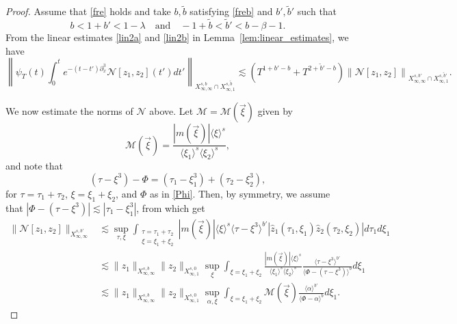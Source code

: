 \documentclass[a4paper,
11pt,  reqno]{amsart}
\newcommand{\jap}[1]{\langle #1 \rangle}
\newcommand{\5}{\textup{V}}
\newcommand{\ft}{\widehat}
\newcommand{\les}{\lesssim}
\newcommand{\wt}{\widetilde}
\theoremstyle{remark}
\newcommand{\jb}[1]
{\langle #1 \rangle}
\newcommand{\M}{\mathcal{M}}
\numberwithin{equation}{section}
\numberwithin{theorem}{section}
\newcommand{\Ncal}{\mathcal{N}}
\begin{document}
		\begin{proof}
Assume that \eqref{fre} holds and take $b,\wt b$ satisfying \eqref{freb} and $b', \wt b'$ such that
			$$
			 b < 1+b'< 1-\lambda
             \quad
             \text{and}
             \quad 
             -1+\wt{b}<\wt{b}'<b-\beta-1.
$$
From the linear estimates \eqref{lin2a} and \eqref{lin2b} in Lemma~\ref{lem:linear_estimates}, we have
        $$
        \left\|\psi_T(t)\int_0^t e^{-(t-t')\partial_x^3}\Ncal[z_1,z_2](t')dt' \right\|_{X^{s,b}_{\infty, \infty} \cap X^{s,\wt{b}}_{\infty,1}}  \lesssim (T^{1+b'-b} + T^{2+\wt{b}'-b})\left\|\Ncal[z_1,z_2] \right\|_{X^{s,b'}_{\infty, \infty} \cap X^{s,\wt{b}'}_{\infty,1}}.
        $$

We now estimate the norms of $\Ncal$ above. Let $\M = \M(\vec\xi)$ given by
\begin{equation}
\mathcal{M}(\vec\xi)=\frac{|m(\vec\xi)|\jap{\xi}^s}{\jap{\xi_1}^s\jap{\xi_2}^s}, 
\end{equation}
and note that 
\begin{equation}
(\tau - \xi^3) - \Phi = (\tau_1 - \xi_1^3 ) + (\tau_2 - \xi_2^3), 
\end{equation}
for $\tau=\tau_1+ \tau_2$, $\xi=\xi_1+\xi_2$, and $\Phi$ as in \eqref{Phi}. Then, by symmetry, we assume that $|\Phi - (\tau-\xi^3) | \les |\tau_1 - \xi_1^3|$, from which get
	\begin{align}
				\|\Ncal[z_1,z_2] \|_{X^{s,b'}_{\infty, \infty}} &\lesssim \sup_{\tau,\xi} \int_{\substack{\tau=\tau_1+\tau_2 \\ \xi = \xi_1 + \xi_2}} 
|m(\vec\xi) | \jb{\xi}^s
\jap{\tau-\xi^3}^{b'}
|\ft{z}_1(\tau_1, \xi_1) 
\ft{z}_2(\tau_2, \xi_2)
| 
d\tau_1 d\xi_1 
\\
& 
\lesssim 
 \|z_1\|_{X^{s,b}_{\infty,\infty}}
 \|z_2\|_{X^{s,0}_{\infty, 1}}
\sup_{\xi} 
\int_{\xi = \xi_1 + \xi_2} 
\frac{|m(\vec\xi)| \jb{\xi}^s}{\jb{\xi_1}^s \jb{\xi_2}^s}
\frac{\jb{\tau-\xi^3}^{b'}}{\jb{\Phi - (\tau-\xi^3)}^{b}}
d\xi_1 
\\
& 
\lesssim 
 \|z_1\|_{X^{s,b}_{\infty,\infty}}
 \|z_2\|_{X^{s,0}_{\infty, 1}}
\sup_{\alpha,\xi} 
\int_{\xi = \xi_1 + \xi_2}  \mathcal{M}(\vec\xi)\frac{\jap{\alpha}^{b'}}{\jap{\Phi-\alpha}^b  } d\xi_1 . 
\label{FREinfty1}
			\end{align}



\end{proof}
\end{document}
